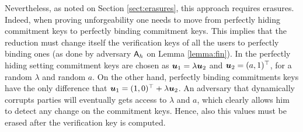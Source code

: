 Nevertheless, as noted on Section \ref{sect:erasures}, this approach requires erasures. Indeed, when proving unforgeability one needs to move from perfectly hiding commitment keys to perfectly binding commitment keys. This implies that the reduction must change itself the verification keys of all the users to perfectly binding ones (as done by adversary $\mathsf{A}_h$ on Lemma \ref{lemma:fin}). In the perfectly hiding setting commitment keys are chosen as ${\boldsymbol{u}}_1 = \lambda{\boldsymbol{u}}_2$ and ${\boldsymbol{u}}_2 = (a,1)^\top$, for a random $\lambda$ and random $a$.  On the other hand, perfectly binding commitments keys have the only difference that ${\boldsymbol{u}}_1 = (1,0)^\top+\lambda{\boldsymbol{u}}_2$. An adversary that dynamically corrupts parties will eventually gets access to $\lambda$ and $a$, which clearly allows him to detect any change on the commitment keys. Hence, also this values must be erased after the verification key is computed.